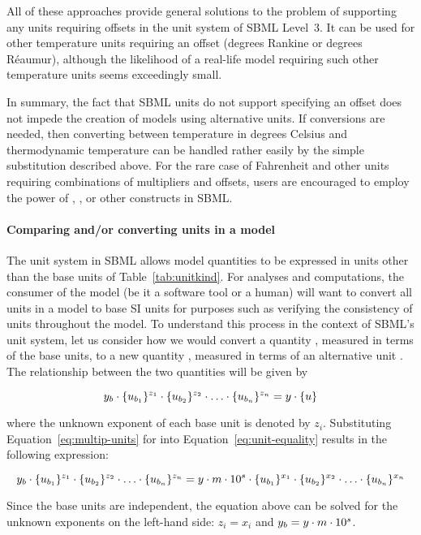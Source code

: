 All of these approaches provide general solutions to the problem
of supporting any units requiring offsets in the unit system of
SBML Level~3.  It can be used for other temperature units
requiring an offset (\eg degrees Rankine or degrees R\'{e}aumur),
although the likelihood of a real-life model requiring such other
temperature units seems exceedingly small.

In summary, the fact that SBML units do not support specifying an
offset does not impede the creation of models using alternative
units.  If conversions are needed, then converting between
temperature in degrees Celsius and thermodynamic temperature can
be handled rather easily by the simple substitution described
above.  For the rare case of Fahrenheit and other units requiring
combinations of multipliers and offsets, users are encouraged to
employ the power of \FunctionDefinition, \AssignmentRule, or other
constructs in SBML.


\paragraph{Comparing and/or converting units in a model}
\label{sec:unit-simple-approach}

The unit system in SBML allows model quantities to be expressed in
units other than the base units of Table~\ref{tab:unitkind}.  For
analyses and computations, the consumer of the model (be it a
software tool or a human) will want to convert all units in a
model to base SI units for purposes such as verifying the
consistency of units throughout the model.  To understand this
process in the context of SBML's unit system, let us consider how
we would convert a quantity \ybase, measured in terms of the base
units, to a new quantity \ynew, measured in terms of an
alternative unit \udef.  The relationship between the two
quantities will be given by
\begin{linenomath}
\begin{equation}
  y_b \cdot \{u_{b_1}\}^{z_1} \cdot \{u_{b_2}\}^{z_2} \cdot \ldots \cdot \{u_{b_n}\}^{z_n} = y  \cdot \{u\} 
\label{eq:unit-equality}
\end{equation}
\end{linenomath}
where the unknown exponent of each base unit is denoted by $z_i$.
Substituting Equation~\ref{eq:multip-units} for \udef into
Equation~\ref{eq:unit-equality} results in the following
expression:
\begin{linenomath}
\begin{equation}
  y_b \cdot \{u_{b_1}\}^{z_1} \cdot \{u_{b_2}\}^{z_2} \cdot \ldots \cdot \{u_{b_n}\}^{z_n}
    = y \cdot m \cdot 10^s \cdot \{u_{b_1}\}^{x_1} \cdot \{u_{b_2}\}^{x_2} \cdot \ldots \cdot \{u_{b_n}\}^{x_n}
\label{eq:unit-conversion}
\end{equation}
\end{linenomath}
Since the base units are independent, the equation above can be
solved for the unknown exponents on the left-hand side:
$z_i = x_i$ and $y_b = y \cdot m \cdot 10^s$.

